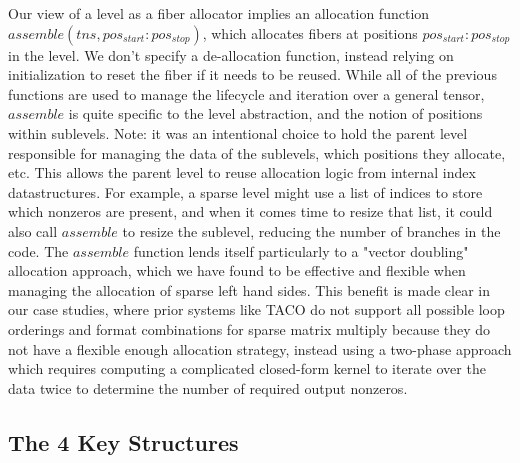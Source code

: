 Our view of a level as a fiber allocator implies an allocation function
$assemble(tns, pos_{start}:pos_{stop})$, which allocates fibers at positions
$pos_{start}:pos_{stop}$ in the level. We don't specify a de-allocation
function, instead relying on initialization to reset the fiber if it needs to be
reused. While all of the previous functions are used to manage the lifecycle and
iteration over a general tensor, $assemble$ is quite specific to the
level abstraction, and the notion of positions within sublevels. Note: it was an
intentional choice to hold the parent level responsible for managing the
data of the sublevels, which positions they allocate, etc. This allows the parent
level to reuse allocation logic from internal index datastructures. For example,
a sparse level might use a list of indices to store which nonzeros are present,
and when it comes time to resize that list, it could also call $assemble$ to resize the
sublevel, reducing the number of branches in the code. The $assemble$ function
lends itself particularly to a "vector doubling" allocation approach, which we
have found to be effective and flexible when managing the allocation
of sparse left hand sides. This benefit is made clear in our case studies,
where prior systems like TACO do not support all possible loop
orderings and format combinations for sparse matrix multiply because they do
not have a flexible enough allocation strategy, instead using a two-phase approach
which requires computing a complicated closed-form kernel to iterate over the
data twice to determine the number of required output nonzeros.

\subsection{The 4 Key Structures}

